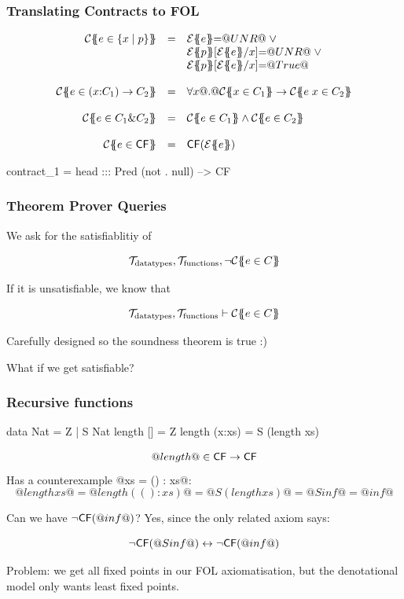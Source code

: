 \documentclass[serif,professionalfont]{beamer}
\begin{document}
\begin{frame}[fragile]
  \frametitle{Translating Contracts to FOL}
  \[\begin{array}{rcl}
  \trc{e \in \{x \mid p \}}
    & = &      \etrans{}{}{e} {=} \unr \; \lor \; \\
    &   &      \etrans{}{}{p}[\etrans{}{}{e}/x] {=} \unr \; \lor \; \\
    &   &      \etrans{}{}{p}[\etrans{}{}{e}/x] {=} \True
  \\ \\
  \trc{e \in (x{:}C_1) \to C_2}
    & = & \formula{\forall x @.@  \trc{x \in C_1} \to \trc{e\;x \in C_2}}
  \\ \\
  \trc{e \in C_1 \& C_2}
     & = & \formula{ \trc{e \in C_1} \land \trc{e \in C_2}}
  \\ \\
  \trc{e \in \cf} & = & \formula{\cf({\etrans{\Sigma}{\Gamma}{e}})} \\
  \end{array}\]

  \begin{code}
    contract_1 = head ::: Pred (not . null) --> CF
  \end{code}

\end{frame}

\begin{frame}[fragile]
  \frametitle{Theorem Prover Queries}

  We ask for the satisfiablitiy of

  $$
    \mathcal{T}_{\text{datatypes}}, \mathcal{T}_{\text{functions}} ,
    \neg {\cal C}\{\!\!\{e \in C\}\!\!\}
  $$

  If it is unsatisfiable, we know that

  $$
    \mathcal{T}_{\text{datatypes}}, \mathcal{T}_{\text{functions}} \vdash
    {\cal C}\{\!\!\{e \in C\}\!\!\}
  $$

  Carefully designed so the soundness theorem is true :)

  What if we get satisfiable?

\end{frame}

\begin{frame}[fragile]
  \frametitle{Recursive functions}
  \vspace{-\baselineskip}
  \begin{code}
    data Nat = Z | S Nat
    length []     = Z
    length (x:xs) = S (length xs)
  \end{code}
  \vspace{-\baselineskip}
  $$@length@ \in \mathsf{CF} \to \mathsf{CF}$$
  Has a counterexample @xs = () : xs@:
  $$@length xs@ = @length (() : xs)@ = @S (length xs)@ = @S inf@ = @inf@$$

  Can we have $\neg\mathsf{CF}(@inf@)$? Yes, since the only related axiom says:

  $$\neg\mathsf{CF}(@S inf@) \leftrightarrow \neg\mathsf{CF}(@inf@)$$

  Problem: we get all fixed points in our FOL axiomatisation, but
  the denotational model only wants least fixed points.

\end{frame}
\end{document}
